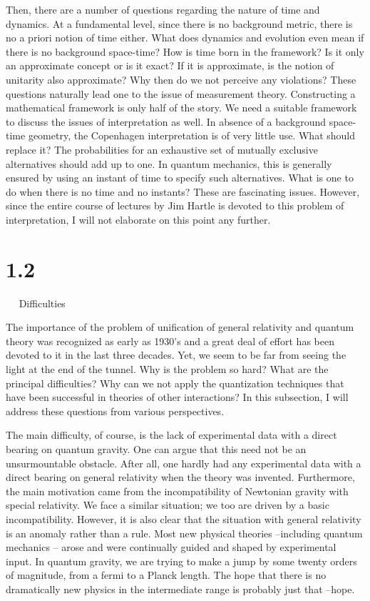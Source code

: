 Then, there are a number of questions regarding the nature
of time and dynamics. At a fundamental level, since there is no background
metric, there is no a priori notion of time either. What does dynamics and
evolution even mean if there is no background space-time? How is time born
in the framework? Is it only an approximate concept or is it exact? If
it is approximate, is the notion of unitarity also approximate? Why then do
we not perceive any violations? These questions naturally lead one to the
issue of measurement theory. Constructing a mathematical framework
is only half of the story. We need a suitable framework to discuss the
issues of interpretation as well. In absence of a background space-time
geometry, the Copenhagen interpretation is of very little use. What should
replace it? The probabilities for an exhaustive set of mutually exclusive
alternatives should add up to one. In quantum mechanics, this is generally
ensured by using an instant of time to specify such alternatives. What is one
to do when there is no time and no instants? These are fascinating issues.
However, since the entire course of lectures by Jim Hartle is devoted to this
problem of interpretation, I will not elaborate on this point any further.

\goodbreak
\section{1.2}{${}\quad$ Difficulties}

The importance of the problem of unification of general relativity
and quantum theory was recognized as early as 1930's and a great deal
of effort has been devoted to it in the last three decades.
Yet, we seem to be far from seeing the light at the end of the tunnel.
Why is the problem so hard? What are the principal difficulties? Why
can we not apply the quantization techniques that have been successful in
theories of other interactions? In this subsection, I will address these
questions from various perspectives.

The main difficulty, of course, is the lack of experimental data with a
direct bearing on quantum gravity. One can argue that this need not be
an unsurmountable obstacle. After all, one hardly had any experimental
data with a direct bearing on general relativity when the theory was invented.
Furthermore, the main motivation came from the incompatibility of Newtonian
gravity with special relativity. We face a similar situation; we too are
driven by a basic incompatibility. However, it is also clear that the
situation with general relativity is an anomaly rather than a rule. Most
new physical theories --including quantum mechanics -- arose and were
continually guided and shaped by experimental input. In quantum gravity,
we are trying to make a jump by some twenty orders of magnitude, from a
fermi to a Planck length. The hope that there is no dramatically new physics
in the intermediate range is probably just that --hope.

